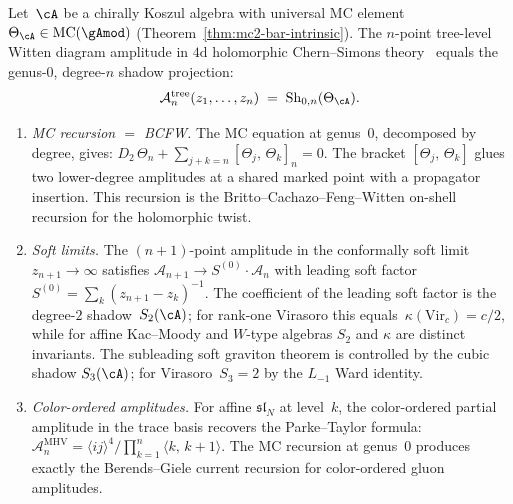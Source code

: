 \begin{proposition}
\label{prop:witten-diagram-shadow-projection}
\ClaimStatusProvedHere
{}
Let~$\cA$ be a chirally Koszul algebra with universal MC element
$\Theta_\cA \in \operatorname{MC}(\gAmod)$
\textup{(}Theorem~\textup{\ref{thm:mc2-bar-intrinsic})}.
The $n$-point tree-level Witten diagram amplitude in $4\mathrm{d}$
holomorphic Chern--Simons theory~\cite{CostelloP2201}
equals the genus-$0$, degree-$n$ shadow projection:
\begin{equation}\label{eq:witten-shadow-identification}
 \mathcal{A}_n^{\mathrm{tree}}(z_1, \ldots, z_n)
 \;=\;
 \mathrm{Sh}_{0,n}(\Theta_\cA).
\end{equation}
\begin{enumerate}[label=\textup{(\roman*)}]
\item \emph{MC recursion $=$ BCFW\@.}
 The MC equation at genus~$0$, decomposed by degree, gives:
 $D_2\,\Theta_n
 + \sum_{j+k=n} [\Theta_j,\, \Theta_k]_n = 0$.
 The bracket $[\Theta_j,\, \Theta_k]$ glues two lower-degree
 amplitudes at a shared marked point with a propagator
 insertion. This recursion is the
 Britto--Cachazo--Feng--Witten on-shell recursion for the
 holomorphic twist.

\item \emph{Soft limits.}
 The $(n{+}1)$-point amplitude in the conformally soft limit
 $z_{n+1} \to \infty$ satisfies
 $\mathcal{A}_{n+1} \to S^{(0)} \cdot \mathcal{A}_n$
 with leading soft factor
 $S^{(0)} = \sum_k (z_{n+1} - z_k)^{-1}$.
 The coefficient of the leading soft factor is the
 degree-$2$ shadow~$S_2(\cA)$; for rank-one Virasoro
 this equals~$\kappa(\mathrm{Vir}_c) = c/2$, while for
 affine Kac--Moody and $W$-type algebras $S_2$ and $\kappa$
 are distinct invariants.
 The subleading soft graviton theorem is controlled by the
 cubic shadow $S_3(\cA)$; for Virasoro~$S_3 = 2$
 by the $L_{-1}$ Ward identity.

\item \emph{Color-ordered amplitudes.}
 For affine $\mathfrak{sl}_N$ at level~$k$, the color-ordered
 partial amplitude in the trace basis recovers the
 Parke--Taylor formula:
 $\mathcal{A}_n^{\mathrm{MHV}}
 = \langle ij \rangle^4 / \prod_{k=1}^{n}
 \langle k,\,k{+}1\rangle$.
 The MC recursion at genus~$0$ produces exactly the
 Berends--Giele current recursion for color-ordered gluon
 amplitudes.
\end{enumerate}
\end{proposition}

